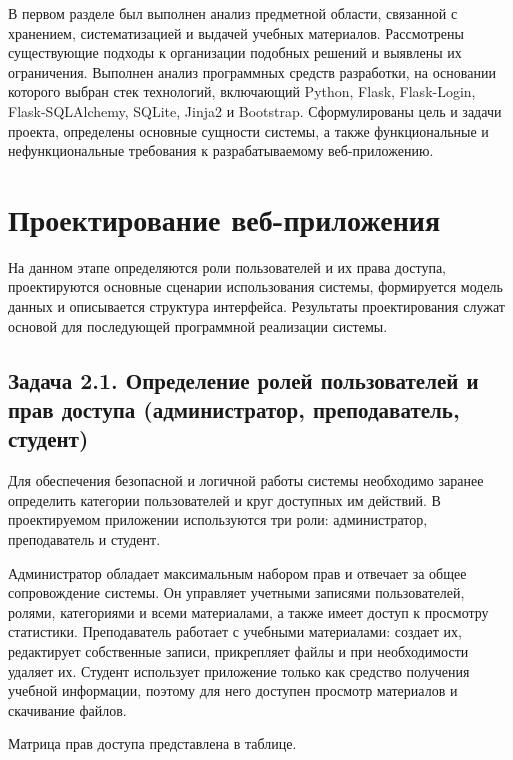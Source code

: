 \documentclass[14pt,a4paper]{extarticle}
\begin{document}
В первом разделе был выполнен анализ предметной области, связанной с хранением, систематизацией и выдачей учебных материалов. Рассмотрены существующие подходы к организации подобных решений и выявлены их ограничения. Выполнен анализ программных средств разработки, на основании которого выбран стек технологий, включающий Python, Flask, Flask-Login, Flask-SQLAlchemy, SQLite, Jinja2 и Bootstrap. Сформулированы цель и задачи проекта, определены основные сущности системы, а также функциональные и нефункциональные требования к разрабатываемому веб-приложению.

\section{Проектирование веб-приложения}

На данном этапе определяются роли пользователей и их права доступа, проектируются основные сценарии использования системы, формируется модель данных и описывается структура интерфейса. Результаты проектирования служат основой для последующей программной реализации системы.

\subsection{Задача 2.1. Определение ролей пользователей и прав доступа (администратор, преподаватель, студент)}

Для обеспечения безопасной и логичной работы системы необходимо заранее определить категории пользователей и круг доступных им действий. В проектируемом приложении используются три роли: администратор, преподаватель и студент.

Администратор обладает максимальным набором прав и отвечает за общее сопровождение системы. Он управляет учетными записями пользователей, ролями, категориями и всеми материалами, а также имеет доступ к просмотру статистики. Преподаватель работает с учебными материалами: создает их, редактирует собственные записи, прикрепляет файлы и при необходимости удаляет их. Студент использует приложение только как средство получения учебной информации, поэтому для него доступен просмотр материалов и скачивание файлов.

Матрица прав доступа представлена в таблице.
\end{document}
